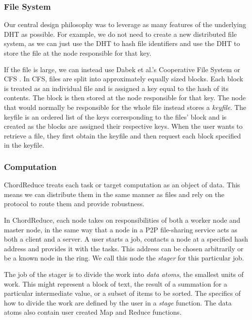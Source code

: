 \subsubsection{File System}
Our central design philosophy was to leverage as many features of the underlying DHT as possible.
For example, we do not need to create a new distributed file system, as we can just use the DHT to hash file identifiers and use the DHT to store the file at the node responsible for that key.

If the file is large, we can instead use Dabek et al.'s Cooperative File System or CFS \cite{CFS}.
In CFS, files are split into approximately equally sized blocks.
Each block is treated as an individual file and is assigned a key equal to the hash of its contents.
The block is then stored at the node responsible for that key.
The node that would normally be responsible for the whole file instead stores a \textit{keyfile}.
The keyfile is an ordered list of the keys corresponding to the files' block and is created as the blocks are assigned their respective keys.
When the user wants to retrieve a file, they first obtain the keyfile and then request each block specified in the keyfile.


\subsubsection{Computation}
ChordReduce treats each task or target computation as an object of data.
This means we can distribute them in the same manner as files and rely on the protocol to route them and provide robustness.


In ChordReduce, each node takes on responsibilities of both a worker node and master node, in the same way that a node in a P2P file-sharing service acts as both a client and a server.
A user starts a job, contacts a node at a specified hash address and provides it with the tasks.
This address can be chosen arbitrarily or be a known node in the ring.
We call this node the \textit{stager} for this particular job.

The job of the stager is to divide the work into \emph{data atoms}, the smallest units of work.
This might represent a block of text, the result of a summation for a particular intermediate value, or a subset of items to be sorted.
The specifics of how to divide the work are defined by the user in a \emph{stage} function.
The data atoms also contain user created Map and Reduce functions.

